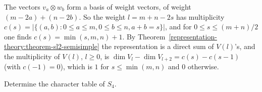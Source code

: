 \begin{solution}
The vectors $v_a \otimes w_b$ form a basis of weight vectors, of weight $(m - 2a) + (n - 2b)$. So the weight
$l = m + n - 2s$ has multiplicity $c(s) = |\{(a, b) : 0 \leq a \leq m, 0 \leq b \leq n, a + b = s\}|$, and for
$0 \leq s \leq (m+n)/2$ one finds $c(s) = \min(s, m, n) + 1$. By Theorem~\ref{representation-theory:theorem-sl2-semisimple}
the representation is a direct sum of $V(l)$'s, and the multiplicity of $V(l)$, $l \geq 0$, is
$\dim V_l - \dim V_{l+2} = c(s) - c(s - 1)$ (with $c(-1) = 0$), which is $1$ for $s \leq \min(m, n)$ and $0$ otherwise.
\end{solution}

\begin{exercise}\label{representation-theory:exercise-character-table-s4}
Determine the character table of $S_4$.
\end{exercise}

